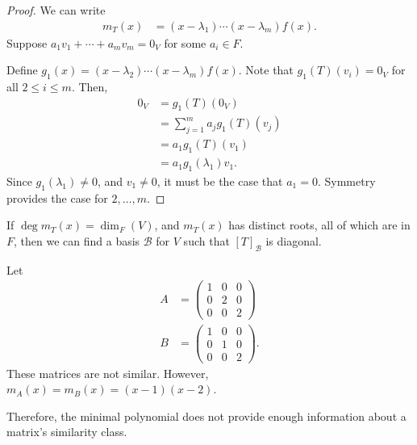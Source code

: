 \documentclass[10pt]{mypackage}
\begin{document}
\begin{proof}
  We can write
  \begin{align*}
    m_T(x) &= \left(x-\lambda_1\right)\cdots\left(x-\lambda_m\right)f(x).
  \end{align*}
  Suppose $a_1v_1 + \cdots + a_mv_m = 0_V$ for some $a_i\in F$.\newline

  Define $g_1(x) = \left(x-\lambda_2\right)\cdots\left(x-\lambda_m\right)f(x)$. Note that $g_1(T)(v_i) = 0_V$ for all $2\leq i \leq m$. Then,
  \begin{align*}
    0_V &= g_1(T)\left(0_V\right)\\
        &= \sum_{j=1}^{m}a_jg_1(T)\left(v_j\right)\\
        &= a_1g_1(T)\left(v_1\right)\\
        &= a_1g_1\left(\lambda_1\right)v_1.
  \end{align*}
  Since $g_1\left(\lambda_1\right)\neq 0$, and $v_1\neq 0$, it must be the case that $a_1 = 0$. Symmetry provides the case for $2,\dots,m$.
\end{proof}
\begin{corollary}
  If $\deg m_{T}\left(x\right) = \dim_{F}\left(V\right)$, and $m_{T}\left(x\right)$ has distinct roots, all of which are in $F$, then we can find a basis $\mathcal{B}$ for $V$ such that $\left[T\right]_{\mathcal{B}}$ is diagonal.
\end{corollary}
\begin{example}
  Let
  \begin{align*}
    A &= \begin{pmatrix}1 & 0 & 0 \\ 0 & 2 & 0 \\ 0 & 0 & 2\end{pmatrix}\\
    B &= \begin{pmatrix}1 & 0 & 0 \\ 0 & 1 & 0 \\ 0 & 0 & 2\end{pmatrix}.
  \end{align*}
  These matrices are not similar. However, $m_{A}(x) = m_{B}\left(x\right) = \left(x-1\right)\left(x-2\right)$.\newline

  Therefore, the minimal polynomial does not provide enough information about a matrix's similarity class.
\end{example}
\end{document}
